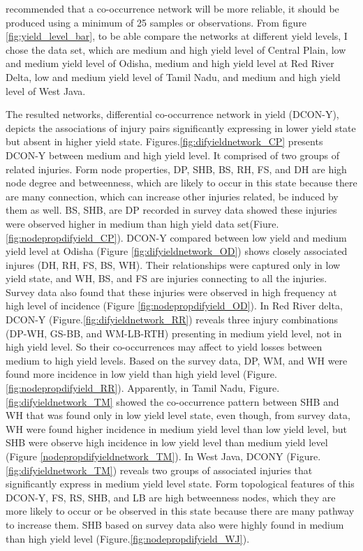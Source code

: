 \citet{Berry_2014_Deciphering} recommended that a co-occurrence network will be more reliable, it should be produced using a minimum of 25 samples or observations. From figure \ref{fig:yield_level_bar}, to be able compare the networks at different yield levels, I chose the data set, which are medium and high yield level of Central Plain, low and medium yield level of Odisha, medium and high yield level at Red River Delta, low and medium yield level of Tamil Nadu, and medium and high yield level of West Java. 

The resulted networks, differential co-occurrence network in yield (DCON-Y), depicts the associations of injury pairs significantly expressing in lower yield state but absent in higher yield state. Figures.\ref{fig:difyieldnetwork_CP} presents DCON-Y between medium and high yield level. It comprised of two groups of related injuries. Form node properties, DP, SHB, BS, RH, FS, and DH are high node degree and betweenness, which are likely to occur in this state because there are many connection, which can increase other injuries related, be induced by them as well. BS, SHB, are DP recorded in survey data showed these injuries were observed higher in medium than high yield data set(Fiure. \ref{fig:nodepropdifyield_CP}). DCON-Y compared between low yield and medium yield level at Odisha (Figure \ref{fig:difyieldnetwork_OD}) shows closely associated injures (DH, RH, FS, BS, WH). Their relationships were captured only in low yield state, and WH, BS, and FS are injuries connecting to all the injuries. Survey data also found that these injuries were observed in high frequency at high level of incidence (Figure \ref{fig:nodepropdifyield_OD}). In Red River delta, DCON-Y (Figure.\ref{fig:difyieldnetwork_RR}) reveals three injury combinations (DP-WH, GS-BB, and WM-LB-RTH) presenting in medium yield level, not in high yield level. So their co-occurrences may affect to yield losses between medium to high yield levels. Based on the survey data, DP, WM, and WH were found more incidence in low yield than high yield level (Figure. \ref{fig:nodepropdifyield_RR}). Apparently, in Tamil Nadu, Figure.\ref{fig:difyieldnetwork_TM} showed the co-occurrence pattern between SHB and WH that was found only in low yield level state, even though, from survey data, WH were found higher incidence in medium yield level than low yield level, but SHB were observe high incidence in low yield level than medium yield level (Figure \ref{nodepropdifyieldnetwork_TM}). In West Java, DCONY (Figure. \ref{fig:difyieldnetwork_TM}) reveals two groups of associated injuries that significantly express in medium yield level state. Form topological features of this DCON-Y, FS, RS, SHB, and LB are high betweenness nodes, which they are more likely to occur or be observed in this state because there are many pathway to increase them. SHB based on survey data also were highly found in medium than high yield level (Figure.\ref{fig:nodepropdifyield_WJ}).  

